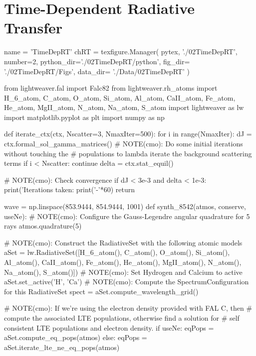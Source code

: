 \chapter{Time-Dependent Radiative Transfer}\label{Chap:TimeDepRt}

\begin{pycode}[TimeDepRT]
name = 'TimeDepRT'
chRT = texfigure.Manager(
    pytex,
    './02TimeDepRT',
    number=2,
    python_dir='./02TimeDepRT/python',
    fig_dir=   './02TimeDepRT/Figs',
    data_dir=  './Data/02TimeDepRT'
)
\end{pycode}

\begin{pycode}[TimeDepRT]
from lightweaver.fal import Falc82
from lightweaver.rh_atoms import H_6_atom, C_atom, O_atom, Si_atom, Al_atom, CaII_atom, Fe_atom, He_atom, MgII_atom, N_atom, Na_atom, S_atom
import lightweaver as lw
import matplotlib.pyplot as plt
import numpy as np

def iterate_ctx(ctx, Nscatter=3, NmaxIter=500):
    for i in range(NmaxIter):
        dJ = ctx.formal_sol_gamma_matrices()
        # NOTE(cmo): Do some initial iterations without touching the
        # populations to lambda iterate the background scattering terms
        if i < Nscatter:
            continue
        delta = ctx.stat_equil()

        # NOTE(cmo): Check convergence
        if dJ < 3e-3 and delta < 1e-3:
            print('Iterations taken: %
            print('-'*60)
            return

wave = np.linspace(853.9444, 854.9444, 1001)
def synth_8542(atmos, conserve, useNe):
    # NOTE(cmo): Configure the Gauss-Legendre angular quadrature for 5 rays
    atmos.quadrature(5)

    # NOTE(cmo): Construct the RadiativeSet with the following atomic models
    aSet = lw.RadiativeSet([H_6_atom(), C_atom(), O_atom(), Si_atom(), Al_atom(), CaII_atom(),
                            Fe_atom(), He_atom(), MgII_atom(), N_atom(), Na_atom(), S_atom()])
    # NOTE(cmo): Set Hydrogen and Calcium to active
    aSet.set_active('H', 'Ca')
    # NOTE(cmo): Compute the SpectrumConfiguration for this RadiativeSet
    spect = aSet.compute_wavelength_grid()

    # NOTE(cmo): If we're using the electron density provided with FAL C, then
    # compute the associated LTE populations, otherwise find a solution for
    # self consistent LTE populations and electron density.
    if useNe:
        eqPops = aSet.compute_eq_pops(atmos)
    else:
        eqPops = aSet.iterate_lte_ne_eq_pops(atmos)


\end{pycode}
